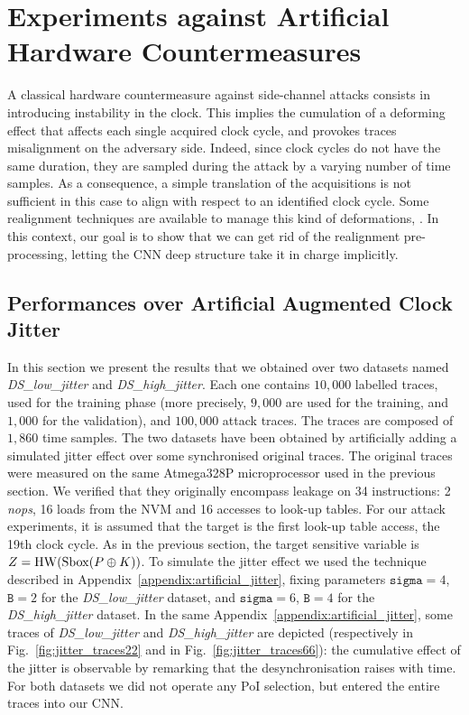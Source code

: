 

\section{Experiments against Artificial Hardware Countermeasures}\label{sec:hard}

A classical hardware countermeasure against side-channel attacks consists in introducing instability in the clock. This implies the cumulation of a deforming effect that affects each single acquired clock cycle, and provokes traces misalignment on the adversary side. Indeed, since clock cycles do not have the same duration, they are sampled during the attack by a varying number of time samples. As a consequence, a simple translation of the acquisitions is not sufficient in this case to align with respect to an identified clock cycle. Some realignment techniques are available to manage this kind of deformations, \eg \cite{van2011improving}. In this context, our goal is to show that  we can get rid of the realignment pre-processing, letting the CNN deep structure take it in charge implicitly. 

\subsection{Performances over Artificial Augmented Clock Jitter}\label{sec:artificial}
In this section we present the results that we obtained over two datasets named \emph{DS\_low\_jitter} and \emph{DS\_high\_jitter}. Each one contains $10,000$ labelled traces, used for the training phase (more precisely, $9,000$ are used for the training, and $1,000$ for the validation), and $100,000$ attack traces. The traces are composed of $1,860$ time samples. The two datasets have been obtained by artificially adding a simulated jitter effect over some synchronised original traces. The original traces were measured on the same Atmega328P microprocessor used in the previous section. We verified that they originally encompass leakage on 34 instructions: 2 \emph{nops}, 16 loads from the NVM and 16 accesses to look-up tables. For our attack experiments, it is assumed that the target is the first look-up table access, \ie the 19th clock cycle. As in the previous section, the target sensitive variable is $Z=\mathrm{HW}(\mathrm{Sbox}(P\oplus K))$. To simulate the jitter effect we used the technique described in Appendix~\ref{appendix:artificial_jitter}, fixing parameters $\texttt{sigma}=4$, $\texttt{B}=2$ for the \emph{DS\_low\_jitter} dataset,  and $\texttt{sigma}=6$, $\texttt{B}=4$ for the \emph{DS\_high\_jitter} dataset. In the same Appendix~\ref{appendix:artificial_jitter},  some traces of  \emph{DS\_low\_jitter} and  \emph{DS\_high\_jitter} are depicted (respectively in Fig.~\ref{fig:jitter_traces22} and in Fig.~\ref{fig:jitter_traces66}): the cumulative effect of the jitter is observable by remarking that the desynchronisation raises with time. For both datasets we did not operate any PoI selection, but entered the entire traces into our CNN.\\

